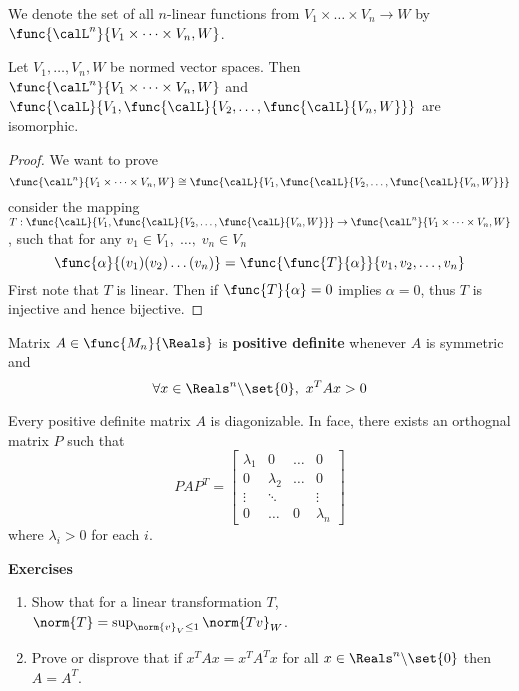 We denote  the set of all \(n\)-linear functions from \(V_1 \times \dots \times V_n \to W\) by \(\func{\calL^n}{V_1 \times \dots \times V_n, W}\).
\begin{proposition} \label{pr:nLinearIsmorphicLinear}
    Let \(V_1, \dots , V_n, W\) be normed vector spaces. Then \(\func{\calL^n}{V_1 \times \dots \times V_n, W}\) and \(\func{\calL}{V_1 , \func{\calL}{V_2, \dots ,\func{\calL}{V_n,W}}}\) are isomorphic.
\end{proposition}

\begin{proof}
    We want to prove
    \begin{equation*}
        \func{\calL^n}{V_1 \times \dots \times V_n, W} \cong \func{\calL}{V_1 , \func{\calL}{V_2, \dots ,\func{\calL}{V_n,W}}}
    \end{equation*}
    consider the mapping \(T : \func{\calL}{V_1 ,\func{\calL}{V_2, \dots ,\func{\calL}{V_n,W}}} \to \func{\calL^n}{V_1 \times \dots \times V_n, W}\), such that for any \(v_1 \in V_1,\; \dots, \; v_n \in V_n\)
    \begin{equation*}
        \func{\alpha}{(v_1)(v_2) \dots (v_n)} = \func{\func{T}{\alpha}}{v_1,v_2, \dots, v_n}
    \end{equation*}
    First note that \(T\) is linear. Then if \(\func{T}{\alpha} = 0\) implies \(\alpha  = 0\), thus \(T\) is injective and hence bijective.
\end{proof}

\begin{definition}
    Matrix \(A \in \func{M_n}{\Reals}\) is \textbf{positive definite} whenever \(A\) is symmetric and 
    \begin{equation*}
        \forall x \in \Reals^n \backslash \set{0}, \ x^T A x > 0
    \end{equation*}
\end{definition}

\begin{theorem}
     Every positive definite matrix \(A\) is diagonizable. In face, there exists an orthognal matrix \(P\) such that 
     \begin{equation*}
         PAP^T = \begin{bmatrix}
             \lambda_1 & 0&\dots & 0 \\
             0 & \lambda_2 & \dots & 0\\
             \vdots & \ddots & & \vdots\\
             0 & \dots & 0 & \lambda_n
         \end{bmatrix}
     \end{equation*}
     where \(\lambda_i > 0\) for each \(i\).
\end{theorem}

{\Large\textbf{Exercises}}
\begin{enumerate}
    \item Show that for a linear transformation \(T\), \(\norm{T} = \sup_{\norm{v}_V \leq 1} \norm{Tv}_W\).
    \item Prove or disprove that if \(x^T A x = x^T A^T x\) for all \(x \in \Reals^n \backslash \set{0}\) then \(A = A^T\).
\end{enumerate}
\newpage

